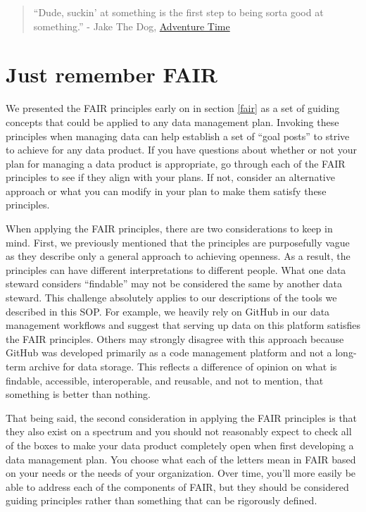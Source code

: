 \documentclass[
]{book}
\begin{document}
\begin{quote}
``Dude, suckin' at something is the first step to being sorta good at something.'' - Jake The Dog, \href{https://en.wikipedia.org/wiki/Adventure_Time}{Adventure Time}
\end{quote}

\hypertarget{just-remember-fair}{%
\section{Just remember FAIR}\label{just-remember-fair}}

We presented the FAIR principles early on in section \ref{fair} as a set of guiding concepts that could be applied to any data management plan. Invoking these principles when managing data can help establish a set of ``goal posts'' to strive to achieve for any data product. If you have questions about whether or not your plan for managing a data product is appropriate, go through each of the FAIR principles to see if they align with your plans. If not, consider an alternative approach or what you can modify in your plan to make them satisfy these principles.

When applying the FAIR principles, there are two considerations to keep in mind. First, we previously mentioned that the principles are purposefully vague as they describe only a general approach to achieving openness. As a result, the principles can have different interpretations to different people. What one data steward considers ``findable'' may not be considered the same by another data steward. This challenge absolutely applies to our descriptions of the tools we described in this SOP. For example, we heavily rely on GitHub in our data management workflows and suggest that serving up data on this platform satisfies the FAIR principles. Others may strongly disagree with this approach because GitHub was developed primarily as a code management platform and not a long-term archive for data storage. This reflects a difference of opinion on what is findable, accessible, interoperable, and reusable, and not to mention, that something is better than nothing.

That being said, the second consideration in applying the FAIR principles is that they also exist on a spectrum and you should not reasonably expect to check all of the boxes to make your data product completely open when first developing a data management plan. You choose what each of the letters mean in FAIR based on your needs or the needs of your organization. Over time, you'll more easily be able to address each of the components of FAIR, but they should be considered guiding principles rather than something that can be rigorously defined.
\end{document}
